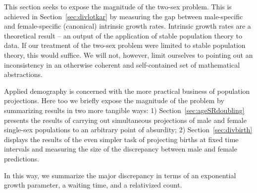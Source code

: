 
This section seeks to expose the magnitude of the two-sex problem. This is
achieved in Section~\ref{sec:divlotkar} by measuring the gap between
male-specific and female-specific (canonical) intrinsic growth rates. Intrinsic growth rates are a
theoretical result -- an output of the application of stable population 
theory to data. If our treatment of the two-sex problem were limited to 
stable population theory, this would suffice. We will not, however, limit
ourselves to pointing out an inconsistency in an otherwise coherent and
self-contained set of mathematical abstractions. 

Applied demography is concerned with the more practical
business of population projections. Here too we briefly
expose the magnitude of the problem by summarizing results in two more tangible
ways: 1) Section~\ref{sec:ageSRdoubling} presents the results of carrying out
simultaneous projections of male and female single-sex populations to an 
arbitrary point of absurdity; 2) Section~\ref{sec:divbirth} displays the
results of the even simpler task of projecting births at fixed time intervals
and measuring the size of the discrepancy between male and female predictions.

In this way, we summarize the major discrepancy in terms of an exponential
growth parameter, a waiting time, and a relativized count.


